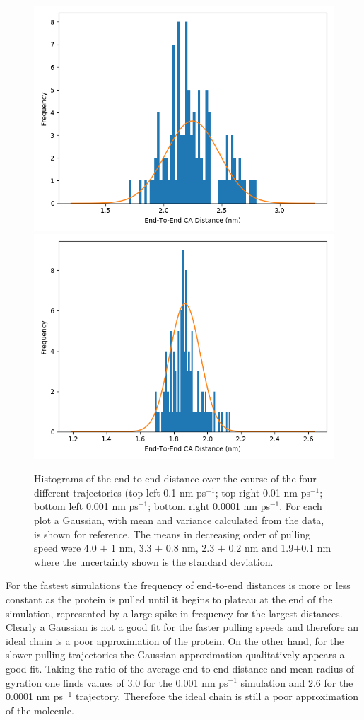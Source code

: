 \documentclass[12pt, onecolumn]{revtex4}    %
\begin{document}
\begin{figure}
\includegraphics[scale=0.33]{E2EH3}
\includegraphics[scale=0.33]{E2EH4}
\caption{Histograms of the end to end distance over the course of the four different trajectories (top left 0.1 nm ps$^{-1}$; top right 0.01 nm ps$^{-1}$; bottom left 0.001 nm ps$^{-1}$; bottom right 0.0001 nm ps$^{-1}$.  For each plot a Gaussian, with mean and variance calculated from the data, is shown for reference.  The means in decreasing order of pulling speed were
4.0 $\pm$ 1 nm, 3.3 $\pm$ 0.8 nm, 2.3 $\pm$ 0.2 nm and 1.9$\pm$0.1 nm where the uncertainty shown is the standard deviation.}
\end{figure}

For the fastest simulations the frequency of end-to-end distances is more or less constant as the protein is pulled until it begins to plateau at the end of the simulation, represented by a large spike in frequency for the largest distances.  Clearly a Gaussian is not a good fit for the faster pulling speeds and therefore an ideal chain is a poor approximation of the protein.  On the other hand, for the slower pulling trajectories the Gaussian approximation qualitatively appears a good fit.  Taking the ratio of the average end-to-end distance and mean radius of gyration one finds values of 3.0 for the 0.001 nm ps$^{-1}$ simulation and 2.6 for the 0.0001 nm ps$^{-1}$ trajectory.  Therefore the ideal chain is still a poor approximation of the molecule.  
\end{document}

